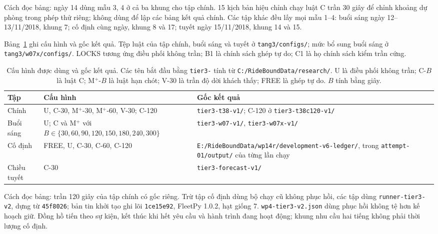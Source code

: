 Cách đọc bảng: ngày 14 dùng mẫu 3, 4 ở cả ba khung cho tập chính. 15 kịch bản hiệu chỉnh chạy luật C trần 30 giây để chỉnh khoảng dự phòng trong phép thử riêng; không dùng để lập các bảng kết quả chính. Các tập khác đều lấy mọi mẫu 1--4: buổi sáng ngày 12--13/11/2018, khung 7; cố định cùng ngày, khung 8 và 17; tuyết ngày 15/11/2018, khung 14 và 15.

Bảng~\ref{bang:pl-goc} ghi cấu hình và gốc kết quả. Tệp luật của tập chính, buổi sáng và tuyết ở \nolinkurl{tang3/configs/}; mức bổ sung buổi sáng ở \nolinkurl{tang3/w07x/configs/}. LOCKS tương ứng điều phối không trần; B1 là chính sách ghép tự do; C1 là họ chính sách kiểm trần cứng.

\begin{table}[htbp]
\centering
\caption{Cấu hình được dùng và gốc kết quả. Các tên bắt đầu bằng \texttt{tier3-} tính từ \nolinkurl{C:/RideBoundData/research/}. U là điều phối không trần; C-$B$ là luật C; M$^+$-$B$ là luật hạn chót; V-30 là trần độ dời khách thấy; FREE là ghép tự do. $B$ tính bằng giây.}
\label{bang:pl-goc}
\begin{tabular}{@{}p{2.8cm}p{5.4cm}p{6.8cm}@{}}
\toprule
\textbf{Tập} & \textbf{Cấu hình} & \textbf{Gốc kết quả} \\
\midrule
Chính & U, C-30, M$^+$-30, M$^+$-60, V-30; C-120 & \nolinkurl{tier3-t38-v1/}; C-120 ở \nolinkurl{tier3-t38c120-v1/} \\
Buổi sáng & U; C và M$^+$ với $B\in\{30,60,90,120,150,180,240,300\}$ & \nolinkurl{tier3-w07-v1/}, \nolinkurl{tier3-w07x-v1/} \\
Cố định & FREE, U, C-30, C-60, C-120 & \nolinkurl{E:/RideBoundData/wp14r/development-v6-ledger/}, trong \nolinkurl{attempt-01/output/} của từng lần chạy \\
Chiều tuyết & C-30 & \nolinkurl{tier3-forecast-v1/} \\
\bottomrule
\end{tabular}
\end{table}

Cách đọc bảng: trần 120 giây của tập chính có gốc riêng. Trừ tập cố định dùng bộ chạy cũ không phục hồi, các tập dùng \nolinkurl{runner-tier3-v2}, dựng từ \texttt{45f8026}; bản tin khởi tạo ghi lõi \texttt{1ce15e92}, FleetPy 1.0.2, hạt giống 7. \nolinkurl{wp4-tier3-v2.json} dùng phục hồi không tệ hơn kế hoạch giữ. Đồng hồ tiến theo sự kiện, kết thúc khi hết yêu cầu và hành trình đang hoạt động; khung nhu cầu hai tiếng không phải thời lượng cố định.

